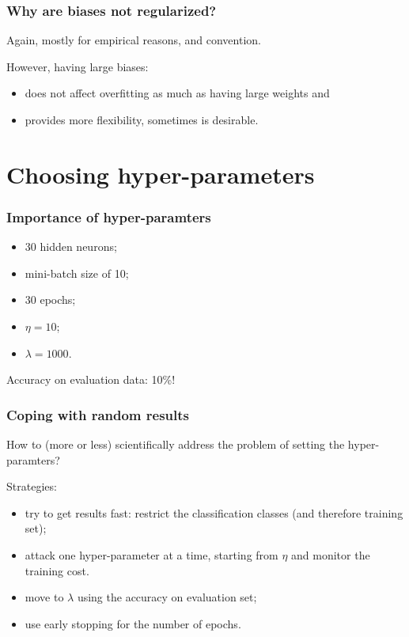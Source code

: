 \documentclass[usenames,dvipsnames]{beamer}
\begin{document}

\begin{frame}
  \frametitle{Why are biases not regularized?}
  
  Again, mostly for empirical reasons, and convention.
  
 \largeskip
 
 However, having large biases:
 \begin{itemize}
  \item does not affect overfitting as much as having large weights and
  \item provides more flexibility, sometimes is desirable.
\end{itemize}

  
\end{frame}


\section{Choosing hyper-parameters}
\begin{frame}
  \frametitle{Importance of hyper-paramters}
  
  \begin{itemize}
  \item 30 hidden neurons;
  \item mini-batch size of 10;
  \item 30 epochs;
  \item $\eta=10$;
  \item $\lambda=1000$.
\end{itemize}

\medskip \pause

Accuracy on evaluation data: 10\%!
  
\end{frame}


\begin{frame}
  \frametitle{Coping with random results}
  
  How to (more or less) scientifically address the problem of setting the hyper-paramters?
  
  Strategies:
  \begin{itemize}
  \item try to get results fast: restrict the classification classes (and therefore training set);
  \item attack one hyper-parameter at a time, starting from $\eta$ and monitor the training cost. 
  \item move to $\lambda$ using the accuracy on evaluation set;
  \item use early stopping for the number of epochs.
\end{itemize}

\end{frame}
\end{document}

